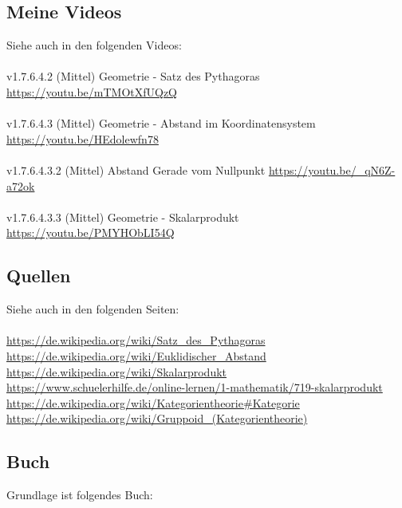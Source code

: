 \documentclass[a4paper]{amsart}
\theoremstyle{definition}
\begin{document}
\subsection*{Meine Videos}
Siehe auch in den folgenden Videos:\\
\\
v1.7.6.4.2 (Mittel) Geometrie - Satz des Pythagoras\\
\url{https://youtu.be/mTMOtXfUQzQ}\\
\\
v1.7.6.4.3 (Mittel) Geometrie - Abstand im Koordinatensystem\\
\url{https://youtu.be/HEdolewfn78}
\\
\\v1.7.6.4.3.2 (Mittel) Abstand Gerade vom Nullpunkt
\url{https://youtu.be/_qN6Z-a72ok}
\\
\\v1.7.6.4.3.3 (Mittel) Geometrie - Skalarprodukt
\url{https://youtu.be/PMYHObLI54Q}

\subsection*{Quellen}
Siehe auch in den folgenden Seiten:\\
\\
\url{https://de.wikipedia.org/wiki/Satz_des_Pythagoras}\\
\url{https://de.wikipedia.org/wiki/Euklidischer_Abstand}\\
\url{https://de.wikipedia.org/wiki/Skalarprodukt}\\
\url{https://www.schuelerhilfe.de/online-lernen/1-mathematik/719-skalarprodukt}\\
\url{https://de.wikipedia.org/wiki/Kategorientheorie#Kategorie}\\
\url{https://de.wikipedia.org/wiki/Gruppoid_(Kategorientheorie)}\\

\subsection*{Buch}
Grundlage ist folgendes Buch:\\
\end{document}
